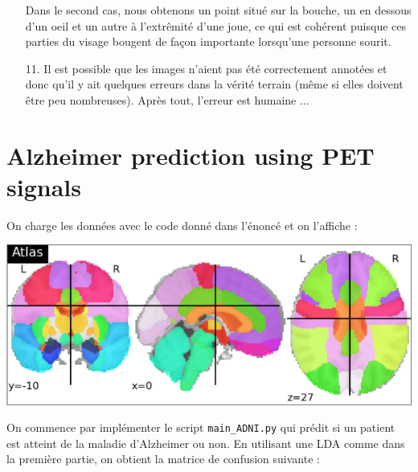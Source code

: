 \documentclass[a4paper, 10pt]{article}
\begin{document}
\begin{itemize}
\vspace*{2mm}

Dans le second cas, nous obtenons un point situé sur la bouche, un en dessous d'un oeil et un autre à l'extrêmité d'une joue, ce qui est cohérent puisque ces parties du visage bougent de façon importante lorsqu'une personne sourit. \\

	\item[11.] Il est possible que les images n'aient pas été correctement annotées et donc qu'il y ait quelques erreurs dans la vérité terrain (même si elles doivent être peu nombreuses). Après tout, l'erreur est humaine ...

\end{itemize}

\section{Alzheimer prediction using PET signals}

On charge les données avec le code donné dans l'énoncé et on l'affiche : \\

\begin{center}
	\includegraphics[scale=0.8]{ROIs.PNG}
\end{center}

On commence par implémenter le script \texttt{main\_ADNI.py} qui prédit si un patient est atteint de la maladie d'Alzheimer ou non. En utilisant une LDA comme dans la première partie, on obtient la matrice de confusion suivante : \\
\end{document}
